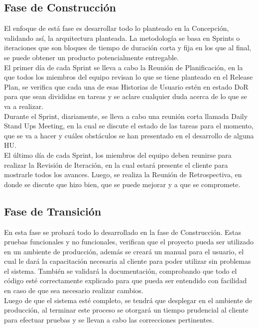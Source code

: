 \subsection{Fase de Construcción}

El enfoque de está fase es desarrollar todo lo planteado en la Concepción, validando así, la arquitectura planteada. La metodología se basa en Sprints o iteraciones que son bloques de tiempo de duración corta y fija en los que al final, se puede obtener un producto potencialmente entregable. \\

El primer día de cada Sprint se lleva a cabo la Reunión de Planificación, en la que todos los miembros del equipo revisan lo que se tiene planteado en el Release Plan, se verifica que cada una de esas Historias de Usuario estén en estado DoR para que sean divididas en tareas y se aclare cualquier duda acerca de lo que se va a realizar. \\

Durante el Sprint, diariamente, se lleva a cabo una reunión corta llamada Daily Stand Ups Meeting, en la cual se discute el estado de las tareas para el momento, que se va a hacer y cuáles obstáculos se han presentado en el desarrollo de alguna HU.\\

El último día de cada Sprint, los miembros del equipo deben reunirse para realizar la Revisión de Iteración, en la cual estará presente el cliente para mostrarle todos los avances. Luego, se realiza la Reunión de Retrospectiva, en donde se discute que hizo bien, que se puede mejorar y a que se compromete.

\subsection{Fase de Transición}

En esta fase se probará todo lo desarrollado en la fase de Construcción. Estas pruebas funcionales y no funcionales, verifican que el proyecto pueda ser utilizado en un ambiente de producción, además se creará un manual para el usuario, el cual le dará la capacitación necesaria al cliente para poder utilizar sin problemas el sistema. También se validará la documentación, comprobando que todo el código esté correctamente explicado para que pueda ser entendido con facilidad en caso de que sea necesario realizar cambios.\\

Luego de que el sistema esté completo, se tendrá que desplegar en el ambiente de producción, al terminar este proceso se otorgará un tiempo prudencial al cliente para efectuar pruebas y se llevan a cabo las correcciones pertinentes.

